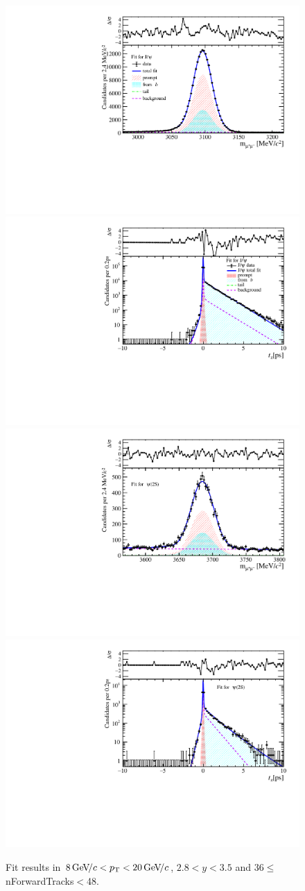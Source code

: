 \begin{figure}[H]
\begin{center}
\includegraphics[width=0.47\linewidth]{pdf/Jpsi/drawmassF/n4y2pt5.pdf}
\includegraphics[width=0.47\linewidth]{pdf/Jpsi/2DFitF/n4y2pt5.pdf}
\vspace*{-0.5cm}
\includegraphics[width=0.47\linewidth]{pdf/Psi2S/drawmassF/n4y2pt5.pdf}
\includegraphics[width=0.47\linewidth]{pdf/Psi2S/2DFitF/n4y2pt5.pdf}
\vspace*{-0.5cm}
\end{center}
\caption{Fit results in $8\text{\,Ge\kern -0.1em V\!/}c<p_{\mathrm{T}}<20\text{\,Ge\kern -0.1em V\!/}c$, $2.8<y<3.5$ and 36$\leq$nForwardTracks$<$48.}
\label{Fitn4y2pt5}
\end{figure}
